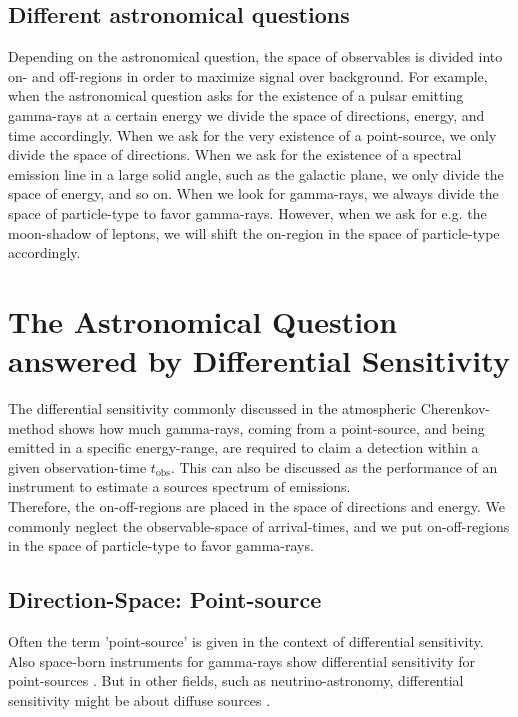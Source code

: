 \documentclass{article}%
\begin{document}
\subsection*{Different astronomical questions}
Depending on the astronomical question, the space of observables is divided into on- and off-regions in order to maximize signal over background.
%
For example, when the astronomical question asks for the existence of a pulsar emitting gamma-rays at a certain energy we divide the space of directions, energy, and time accordingly.
%
When we ask for the very existence of a point-source, we only divide the space of directions.
%
When we ask for the existence of a spectral emission line in a large solid angle, such as the galactic plane, we only divide the space of energy, and so on.
%
When we look for gamma-rays, we always divide the space of particle-type to favor gamma-rays.
%
However, when we ask for e.g. the moon-shadow of leptons, we will shift the on-region in the space of particle-type accordingly.
%
\section{The Astronomical Question answered by Differential Sensitivity}
\label{SecAstronomicalQuastion}
The differential sensitivity commonly discussed in the atmospheric Cherenkov-method shows how much gamma-rays, coming from a point-source, and being emitted in a specific energy-range, are required to claim a detection within a given observation-time $t_\text{obs}$.
%
This can also be discussed as the performance of an instrument to estimate a sources spectrum of emissions.\\
%
Therefore, the on-off-regions are placed in the space of directions and energy.
%
We commonly neglect the observable-space of arrival-times, and we put on-off-regions in the space of particle-type to favor gamma-rays.
%
\subsection*{Direction-Space: Point-source}
%
Often \cite{cta2018baseline,cortina2016machete} the term 'point-source' is given in the context of differential sensitivity.
%
Also space-born instruments for gamma-rays show differential sensitivity for point-sources \cite{wood2016fermiperformance}.
%
But in other fields, such as neutrino-astronomy, differential sensitivity might be about diffuse sources \cite{marinelli2021km3netarca}.
%
\end{document}
